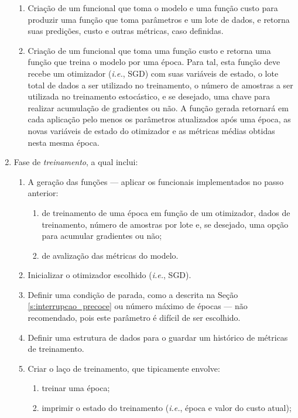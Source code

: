 \begin{enumerate}
\begin{enumerate}
          \item Criação de um funcional que toma o modelo e uma função custo para produzir uma função que toma parâmetros e um lote de dados, e retorna suas predições, custo e outras métricas, caso definidas.
          \item Criação de um funcional que toma uma função custo e retorna uma função que treina o modelo por uma época. Para tal, esta função deve recebe um otimizador (\textit{i.e.}, SGD)  com suas variáveis de estado, o lote total de dados a ser utilizado no treinamento, o número de amostras a ser utilizada no treinamento estocástico, e se desejado, uma chave para realizar acumulação de gradientes ou não. A função gerada retornará em cada aplicação pelo menos os parâmetros atualizados após uma época, as novas variáveis de estado do otimizador e as métricas médias obtidas nesta mesma época.
        \end{enumerate}
      \item Fase de \emph{treinamento}, a qual inclui:
        \begin{enumerate}
          \item A geração das funções --- aplicar os funcionais implementados no passo anterior:
            \begin{enumerate}
              \item de treinamento de uma época em função de um otimizador, dados de treinamento, número de amostras por lote e, se desejado, uma opção para acumular gradientes ou não;
              \item de avalização das métricas do modelo.
            \end{enumerate}
          \item Inicializar o otimizador escolhido (\textit{i.e.}, SGD).
          \item Definir uma condição de parada, como a descrita na Seção \ref{s:interrupcao_precoce} ou número máximo de épocas --- não recomendado, pois este parâmetro é difícil de ser escolhido.
          \item Definir uma estrutura de dados para o guardar um histórico de métricas de treinamento.
          \item Criar o laço de treinamento, que tipicamente envolve:
            \begin{enumerate}
              \item treinar uma época;
              \item imprimir o estado do treinamento (\textit{i.e.}, época e valor do custo atual);

\end{enumerate}
\end{enumerate}
\end{enumerate}
